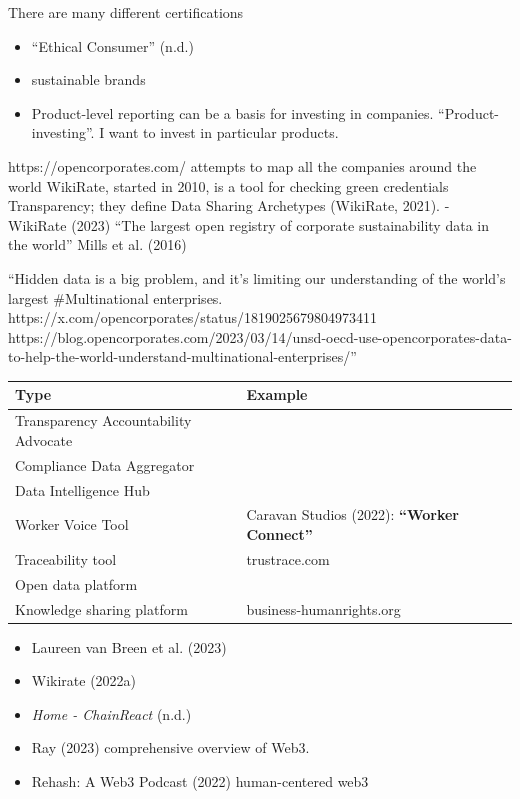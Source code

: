 \documentclass[
  letterpaper,
  DIV=11,
  numbers=noendperiod]{scrartcl}
\providecommand{\tightlist}{%
  \setlength{\itemsep}{0pt}\setlength{\parskip}{0pt}}\usepackage{longtable,booktabs,array}
\begin{document}
There are many different certifications

\begin{itemize}
\item
  {``Ethical {Consumer}''} (n.d.)
\item
  sustainable brands
\item
  Product-level reporting can be a basis for investing in companies.
  ``Product-investing''. I want to invest in particular products.
\end{itemize}

https://opencorporates.com/ attempts to map all the companies around the
world WikiRate, started in 2010, is a tool for checking green
credentials Transparency; they define Data Sharing Archetypes (WikiRate,
2021). - WikiRate (2023) ``The largest open registry of corporate
sustainability data in the world'' Mills et al. (2016)

``Hidden data is a big problem, and it's limiting our understanding of
the world's largest \#Multinational enterprises.
https://x.com/opencorporates/status/1819025679804973411
https://blog.opencorporates.com/2023/03/14/unsd-oecd-use-opencorporates-data-to-help-the-world-understand-multinational-enterprises/''

\begin{longtable}[]{@{}
  >{\raggedright\arraybackslash}p{}
  >{\raggedright\arraybackslash}p{}@{}}
\toprule\noalign{}
\begin{minipage}[b]{\linewidth}\raggedright
Type
\end{minipage} & \begin{minipage}[b]{\linewidth}\raggedright
Example
\end{minipage} \\
\midrule\noalign{}
\endhead
\bottomrule\noalign{}
\endlastfoot
Transparency Accountability Advocate & \\
Compliance Data Aggregator & \\
Data Intelligence Hub & \\
Worker Voice Tool & Caravan Studios (2022): \textbf{``Worker
Connect''} \\
Traceability tool & trustrace.com \\
Open data platform & \\
Knowledge sharing platform & business-humanrights.org \\
\end{longtable}

\begin{itemize}
\tightlist
\item
  Laureen van Breen et al. (2023)
\item
  Wikirate (2022a)
\item
  \emph{Home - {ChainReact}} (n.d.)
\item
  Ray (2023) comprehensive overview of Web3.
\item
  Rehash: A Web3 Podcast (2022) human-centered web3
\end{itemize}
\end{document}
